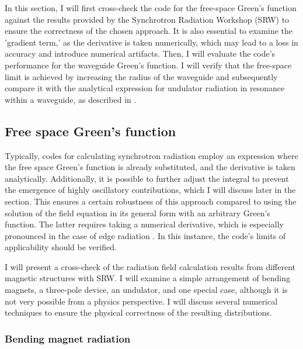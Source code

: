     In this section, I will first cross-check the code for the free-space Green's function against the results provided by the Synchrotron Radiation Workshop (SRW)  to ensure the correctness of the chosen approach. It is also essential to examine the 'gradient term,' as the derivative is taken numerically, which may lead to a loss in accuracy and introduce numerical artifacts. Then, I will evaluate the code's performance for the waveguide Green's function. I will verify that the free-space limit is achieved by increasing the radius of the waveguide and subsequently compare it with the analytical expression for undulator radiation in resonance within a waveguide, as described in .

\subsection{Free space Green's function}

    Typically, codes for calculating synchrotron radiation employ an expression where the free space Green's function is already substituted, and the derivative is taken analytically. Additionally, it is possible to further adjust the integral to prevent the emergence of highly oscillatory contributions, which I will discuss later in the section. This ensures a certain robustness of this approach compared to using the solution of the field equation in its general form with an arbitrary Green's function. The latter requires taking a numerical derivative, which is especially pronounced in the case of edge radiation . In this instance, the code's limits of applicability should be verified.

    I will present a cross-check of the radiation field calculation results from different magnetic structures with SRW. I will examine a simple arrangement of bending magnets, a three-pole device, an undulator, and one special case, although it is not very possible from a physics perspective. I will discuss several numerical techniques to ensure the physical correctness of the resulting distributions.

\subsubsection{Bending magnet radiation}

